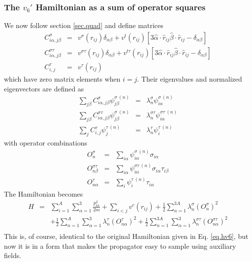 \subsubsection{The $v_6'$ Hamiltonian as a sum of operator squares}
We now follow section \ref{sec.quad} and define matrices
\begin{eqnarray}
C^\sigma_{i\alpha,j\beta} &=& 
v^\sigma(r_{ij})\delta_{\alpha\beta}+v^t(r_{ij})
\left [  3 \hat \alpha \cdot \hat r_{ij}
\hat \beta \cdot \hat r_{ij} -\delta_{\alpha\beta} \right]
\nonumber\\
C^{\sigma\tau}_{i\alpha,j\beta} &= &
v^{\sigma\tau}(r_{ij})\delta_{\alpha\beta}+v^{t\tau}(r_{ij})
\left [  3 \hat \alpha \cdot \hat r_{ij}
\hat \beta \cdot \hat r_{ij} -\delta_{\alpha\beta} \right]
\nonumber\\
C^\tau_{i,j} &=& v^\tau(r_{ij})
\end{eqnarray}
which have zero matrix elements when $i=j$. Their eigenvalues and
normalized eigenvectors are defined as
\begin{eqnarray}
\sum_{j\beta}
C^\sigma_{i\alpha,j\beta} \psi^{\sigma\ (n)}_{j\beta} &=& \lambda^\sigma_n
\psi^{\sigma\ (n)}_{i\alpha}
\nonumber\\
\sum_{j\beta}
C^{\sigma\tau}_{i\alpha,j\beta} \psi^{\sigma\ (n)}_{j\beta} &=&
\lambda^{\sigma\tau}_n \psi^{\sigma\tau\ (n)}_{i\alpha}
\nonumber\\
\sum_{j}
C^{\tau}_{i,j} \psi^{\tau\ (n)}_{j} &=&
\lambda^{\tau}_n \psi^{\tau\ (n)}_{i}
\end{eqnarray}
with operator combinations
\begin{eqnarray}
O^\sigma_n &=& \sum_{i\alpha} \psi^{\sigma\ (n)}_{i\alpha} \sigma_{i\alpha}
\nonumber\\
O^{\sigma\tau}_{n\beta} &=& 
\sum_{i\alpha} \psi^{\sigma\tau\ (n)}_{i\alpha} \sigma_{i\alpha}\tau_{i\beta}
\nonumber\\
O^\tau_{n\alpha} &=&
\sum_{i} \psi^{\tau\ (n)}_{i} \tau_{i\alpha}
\end{eqnarray}
The Hamiltonian becomes
\begin{eqnarray}
H&=&\sum_{i=1}^A\sum_{\alpha=1}^3 \frac{p_{i\alpha}^2}{2m}
+\sum_{i<j} v^{c}(r_{ij})
+\frac{1}{2} \sum_{n=1}^{3A} \lambda^\sigma_n (O^\sigma_n)^2
\nonumber\\
&&
+\frac{1}{2} \sum_{n=1}^{A}\sum_{\alpha=1}^3
\lambda^\tau_n(O^\tau_{n\alpha})^2
+\frac{1}{2} \sum_{n=1}^{3A} \sum_{\alpha=1}^3
\lambda^{\sigma\tau}_n(O^{\sigma\tau}_{n\alpha})^2
\nonumber\\
\end{eqnarray}
This is, of course, identical to the original Hamiltonian given in
Eq. \ref{eq.hv6}, but now it is in a form that makes the propagator
easy to sample using auxiliary fields.

